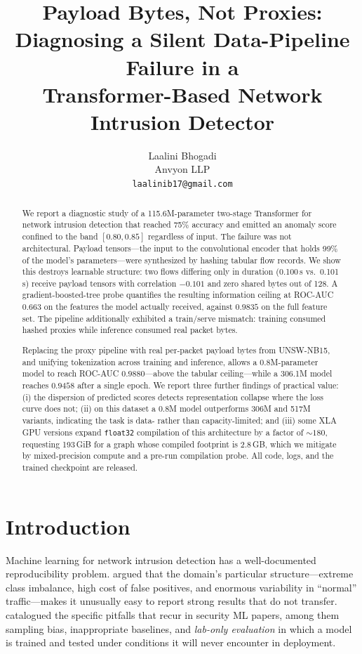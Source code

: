 \documentclass[11pt]{article}
\title{\textbf{Payload Bytes, Not Proxies:}\\
Diagnosing a Silent Data-Pipeline Failure in a\\
Transformer-Based Network Intrusion Detector}
\author{%
  Laalini Bhogadi\\
  Anvyon LLP\\
  \texttt{laalinib17@gmail.com}
}
\date{}
\begin{document}
\maketitle

\begin{abstract}
We report a diagnostic study of a 115.6M-parameter two-stage Transformer for
network intrusion detection that reached 75\% accuracy and emitted an anomaly
score confined to the band $[0.80, 0.85]$ regardless of input. The failure was
not architectural. Payload tensors---the input to the convolutional encoder that
holds 99\% of the model's parameters---were synthesized by hashing tabular flow
records. We show this destroys learnable structure: two flows differing only in
duration (0.100\,s vs.\ 0.101\,s) receive payload tensors with correlation
$-0.101$ and zero shared bytes out of 128. A gradient-boosted-tree probe
quantifies the resulting information ceiling at ROC-AUC $0.663$ on the features
the model actually received, against $0.9835$ on the full feature set. The
pipeline additionally exhibited a train/serve mismatch: training consumed hashed
proxies while inference consumed real packet bytes.

Replacing the proxy pipeline with real per-packet payload bytes from UNSW-NB15,
and unifying tokenization across training and inference, allows a
0.8M-parameter model to reach ROC-AUC $0.9880$---above the tabular
ceiling---while a 306.1M model reaches $0.9458$ after a single epoch. We report
three further findings of practical value: (i) the dispersion of predicted
scores detects representation collapse where the loss curve does not; (ii) on
this dataset a 0.8M model outperforms 306M and 517M variants, indicating the
task is data- rather than capacity-limited; and (iii) some XLA GPU versions
expand \texttt{float32} compilation of this architecture by a factor of
${\sim}180$, requesting 193\,GiB for a graph whose compiled footprint is
2.8\,GB, which we mitigate by mixed-precision compute and a pre-run compilation
probe. All code, logs, and the trained checkpoint are released.
\end{abstract}

\section{Introduction}

Machine learning for network intrusion detection has a well-documented
reproducibility problem. \citet{sommer2010outside} argued that the domain's
particular structure---extreme class imbalance, high cost of false positives,
and enormous variability in ``normal'' traffic---makes it unusually easy to
report strong results that do not transfer. \citet{arp2022dodos} catalogued the
specific pitfalls that recur in security ML papers, among them sampling bias,
inappropriate baselines, and \emph{lab-only evaluation} in which a model is
trained and tested under conditions it will never encounter in deployment.
\end{document}
